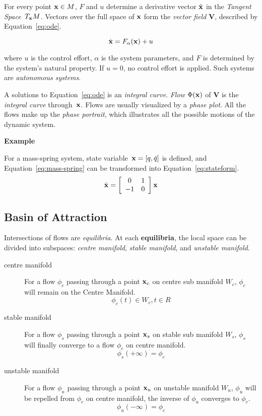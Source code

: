 For every point $\mathbf{x} \in M$, 
$F$ and $u$ determine a derivative vector $\dot{\mathbf{x}}$ in the \emph{Tangent Space}~$T_{\mathbf{x}}M$. 
Vectors over the full space of $\mathbf{x}$ form the \emph{vector field} $\mathbf{V}$, described by Equation~\ref{eq:ode}.

\begin{equation}
\label{eq:ode}
\dot{\mathbf{x}}=F_{\alpha}(\mathbf{x})+u
\end{equation}



where $u$ is the control effort, 
$\alpha$ is the system parameters,
and $F$ is determined by the system's natural property.
If $u=0$,  no control effort is applied.
Such systems are \emph{autonomous systems}. 

A solutions to Equation~\ref{eq:ode} is an \emph{integral curve}. 
\emph{Flow} $\Phi(\mathbf{x})$ of $\mathbf{V}$ is the \emph{integral curve} through~$\mathbf{x}$. 
Flows are usually visualized by a \emph{phase plot}.
All the flows make up the \emph{phase portrait}, which illustrates all the possible motions of the dynamic system.


\textbf{Example}

For a mass-spring system, state variable~$\mathbf{x}=[q,\dot{q}]$ is defined, and Equation~\ref{eq:mass-spring} can be transformed into  Equation~\ref{eq:stateform}.
\begin{equation}
\label{eq:stateform}
\dot{\mathbf{x}}=
\left[ 
\begin{array}{cc}
0 &1\\
-1 &0 
\end{array}
\right]\mathbf{x}
\end{equation}



\subsection{Basin of Attraction}
Intersections of flows are \emph{equilibria}.
At each \textbf{equilibria}, the local space can be divided into subspaces: 
\emph{centre manifold}, \emph{stable manifold}, and \emph{unstable manifold}.
\begin{description} 
\item[centre manifold]
For a flow $\phi_c$ passing through a point $\mathbf{x}_{c}$ on centre sub manifold $W_{c}$, $\phi_c$ will remain on the Centre Manifold. 
\[
\phi_{c}(t) \in W_{c}, t \in R
\]

\item [stable manifold]
For a flow $\phi_{s}$ passing through a point $\mathbf{x}_{s}$ on stable sub manifold $W_{s}$, $\phi_s$ will finally converge to a flow $\phi_c$ on centre manifold.
\[
\phi_{s}(+\infty)=\phi_{c}
\]
\item[unstable manifold]
For a flow $\phi_u$ passing through a point $\mathbf{x}_u$ on unstable manifold $W_{u}$, $\phi_u$ will be repelled from  $\phi_c$ on centre manifold, the inverse of $\phi_u$ converges to $\phi_c$. 
\[
\phi_{u}(-\infty)=\phi_{c}
\] 
\end{description}


